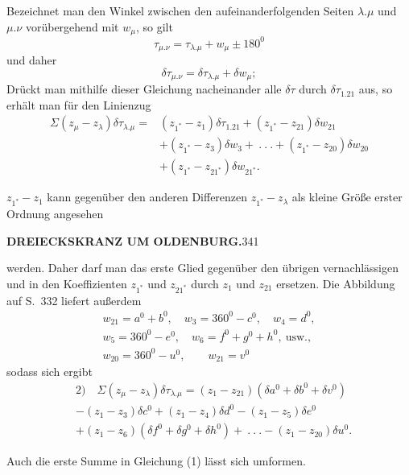 \par\noindent\hspace*{\parindent}Bezeichnet man den Winkel zwischen den aufeinanderfolgenden Seiten \(\lambda.\mu\) und \(\mu.\nu\) vorübergehend mit \(w_\mu\), so gilt
\[
\tau_{\mu.\nu}=\tau_{\lambda.\mu}+w_\mu\pm180^0
\]
\noindent und daher
\[
\delta\tau_{\mu.\nu}=\delta\tau_{\lambda.\mu}+\delta w_\mu;
\]
\noindent Drückt man mithilfe dieser Gleichung nacheinander alle \(\delta\tau\) durch \(\delta\tau_{1.21}\) aus, so erhält man für den Linienzug
\[
\begin{aligned}
\Sigma(z_\mu-z_\lambda)\delta\tau_{\lambda.\mu}={}&(z_{1^*}-z_1)\delta\tau_{1.21}+(z_{1^*}-z_{21})\delta w_{21}\\
&+(z_{1^*}-z_3)\delta w_3+\ .\ .\ .+(z_{1^*}-z_{20})\delta w_{20}\\
&+(z_{1^*}-z_{21^*})\delta w_{21^*}.
\end{aligned}
\]
\par\noindent\hspace*{\parindent}\(z_{1^*}-z_1\) kann gegenüber den anderen Differenzen \(z_{1^*}-z_\lambda\) als kleine Größe erster Ordnung angesehen
\par\clearpage
\noindent\textbf{DREIECKSKRANZ UM OLDENBURG.}\hfill341\par\medskip
\enlargethispage{1.5\baselineskip}
\begingroup\small\setlength{\jot}{1pt}\setlength{\abovedisplayskip}{4pt}\setlength{\belowdisplayskip}{4pt}
\setlength{\abovedisplayshortskip}{2pt}\setlength{\belowdisplayshortskip}{3pt}
\noindent werden. Daher darf man das erste Glied gegenüber den übrigen vernachlässigen und in den Koeffizienten \(z_{1^*}\) und \(z_{21^*}\) durch \(z_1\) und \(z_{21}\) ersetzen. Die Abbildung auf S.~332 liefert außerdem
\[
\begin{gathered}
w_{21}=a^0+b^0,\quad w_3=360^0-c^0,\quad w_4=d^0,\\
w_5=360^0-e^0,\quad w_6=f^0+g^0+h^0,\ \text{usw.,}\\
w_{20}=360^0-u^0,\qquad w_{21}=v^0
\end{gathered}
\]
\noindent sodass sich ergibt
\[
\begin{aligned}
&2)\quad\Sigma(z_\mu-z_\lambda)\delta\tau_{\lambda.\mu}=(z_1-z_{21})(\delta a^0+\delta b^0+\delta v^0)\\
&-(z_1-z_3)\delta c^0+(z_1-z_4)\delta d^0-(z_1-z_5)\delta e^0\\
&+(z_1-z_6)(\delta f^0+\delta g^0+\delta h^0)\!+\ .\ .\ .-(z_1-z_{20})\delta u^0.
\end{aligned}
\]
\par\noindent\hspace*{\parindent}Auch die erste Summe in Gleichung (1) lässt sich umformen.

